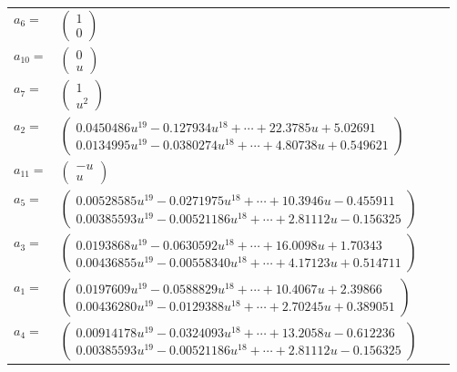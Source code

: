\documentclass[1p]{elsarticle_modified}
\theoremstyle{definition}
\begin{document}
\begin{tabular}{m{7pt} m{180pt} m{7pt} m{180pt} }
\flushright $a_{6}=$&$\begin{pmatrix}1\\0\end{pmatrix}$ \\
\flushright $a_{10}=$&$\begin{pmatrix}0\\u\end{pmatrix}$ \\
\flushright $a_{7}=$&$\begin{pmatrix}1\\u^2\end{pmatrix}$ \\
\flushright $a_{2}=$&$\begin{pmatrix}0.0450486 u^{19}-0.127934 u^{18}+\cdots+22.3785 u+5.02691\\0.0134995 u^{19}-0.0380274 u^{18}+\cdots+4.80738 u+0.549621\end{pmatrix}$ \\
\flushright $a_{11}=$&$\begin{pmatrix}- u\\u\end{pmatrix}$ \\
\flushright $a_{5}=$&$\begin{pmatrix}0.00528585 u^{19}-0.0271975 u^{18}+\cdots+10.3946 u-0.455911\\0.00385593 u^{19}-0.00521186 u^{18}+\cdots+2.81112 u-0.156325\end{pmatrix}$ \\
\flushright $a_{3}=$&$\begin{pmatrix}0.0193868 u^{19}-0.0630592 u^{18}+\cdots+16.0098 u+1.70343\\0.00436855 u^{19}-0.00558340 u^{18}+\cdots+4.17123 u+0.514711\end{pmatrix}$ \\
\flushright $a_{1}=$&$\begin{pmatrix}0.0197609 u^{19}-0.0588829 u^{18}+\cdots+10.4067 u+2.39866\\0.00436280 u^{19}-0.0129388 u^{18}+\cdots+2.70245 u+0.389051\end{pmatrix}$ \\
\flushright $a_{4}=$&$\begin{pmatrix}0.00914178 u^{19}-0.0324093 u^{18}+\cdots+13.2058 u-0.612236\\0.00385593 u^{19}-0.00521186 u^{18}+\cdots+2.81112 u-0.156325\end{pmatrix}$ \\

\end{tabular}
\end{document}
